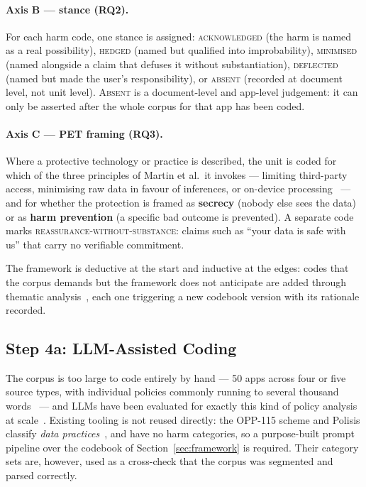 \paragraph{Axis B --- stance (RQ2).}
For each harm code, one stance is assigned: \textsc{acknowledged} (the harm is
named as a real possibility), \textsc{hedged} (named but qualified into
improbability), \textsc{minimised} (named alongside a claim that defuses it
without substantiation), \textsc{deflected} (named but made the user's
responsibility), or \textsc{absent} (recorded at document level, not unit
level). \textsc{Absent} is a document-level and app-level judgement: it can only
be asserted after the whole corpus for that app has been coded.

\paragraph{Axis C --- PET framing (RQ3).}
Where a protective technology or practice is described, the unit is coded for
which of the three principles of Martin et al.\ it invokes --- limiting
third-party access, minimising raw data in favour of inferences, or on-device
processing~\parencite{martin2025cookies} --- and for whether the protection is
framed as \textbf{secrecy} (nobody else sees the data) or as \textbf{harm
prevention} (a specific bad outcome is prevented). A separate code marks
\textsc{reassurance-without-substance}: claims such as \enquote{your data is
safe with us} that carry no verifiable commitment.

The framework is deductive at the start and inductive at the edges: codes that
the corpus demands but the framework does not anticipate are added through
thematic analysis~\parencite{braun2006using}, each one triggering a new codebook
version with its rationale recorded.

\subsection{Step 4a: LLM-Assisted Coding}

The corpus is too large to code entirely by hand --- 50 apps across four or five
source types, with individual policies commonly running to several thousand
words~\parencite{mcdonald2008cost} --- and LLMs have been evaluated for exactly
this kind of policy analysis at scale~\parencite{rodriguez2024llm}. Existing tooling is not reused directly:
the OPP-115 scheme and Polisis classify \emph{data
practices}~\parencite{wilson2016creation,harkous2018polisis}, and have no harm
categories, so a purpose-built prompt pipeline over the codebook of
Section~\ref{sec:framework} is required. Their category sets are, however, used
as a cross-check that the corpus was segmented and parsed correctly.

